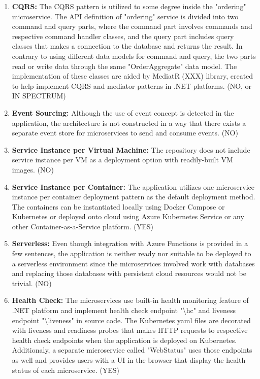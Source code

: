 \documentclass{Configuration_Files/PoliMi3i_thesis}
\begin{document}
\begin{enumerate}
    \item \textbf{CQRS:} The CQRS pattern is utilized to some degree inside the "ordering" microservice.
    The API definition of "ordering" service is divided into two command and query parts, where the command part involves commands and respective command handler classes, and the query part includes query classes that makes a connection to the database and returns the result.
    In contrary to using different data models for command and query, the two parts read or write data through the same "OrderAggregate" data model.
    The implementation of these classes are aided by MediatR (XXX) library, created to help implement CQRS and mediator patterns in .NET platforms. (NO, or IN SPECTRUM)
    
    \item \textbf{Event Sourcing:} Although the use of event concept is detected in the application, the architecture is not constructed in a way that there exists a separate event store for microservices to send and consume events. (NO)
    
    \item \textbf{Service Instance per Virtual Machine:} The repository does not include service instance per VM as a deployment option with readily-built VM images. (NO)

    \item \textbf{Service Instance per Container:} The application utilizes one microservice instance per container deployment pattern as the default deployment method.
    The containers can be instantiated locally using Docker Compose or Kubernetes or deployed onto cloud using Azure Kubernetes Service or any other Container-as-a-Service platform. (YES)
    
    \item \textbf{Serverless:} Even though integration with Azure Functions is provided in a few sentences, the application is neither ready nor suitable to be deployed to a serverless environment since the microservices involved work with databases and replacing those databases with persistent cloud resources would not be trivial. (NO)
    
    \item \textbf{Health Check:} The microservices use built-in health monitoring feature of .NET platform and implement health check endpoint "\textbackslash hc" and liveness endpoint "\textbackslash liveness" in source code.
    The Kubernetes yaml files are decorated with liveness and readiness probes that makes HTTP requests to respective health check endpoints when the application is deployed on Kubernetes.
    Additionaly, a separate microservice called "WebStatus" uses those endpoints as well and provides users with a UI in the browser that display the health status of each microservice. (YES)
    

\end{enumerate}
\end{document}
